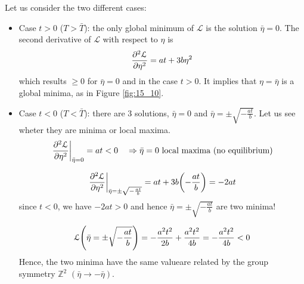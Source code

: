 \documentclass[../main/main.tex]{subfiles}
\begin{document}
Let us consider the two different cases:
\begin{itemize}
\item Case \( t>0 \) (\( T> \bar{T}  \)):  the only global minimum of \( \mathcal{L} \) is the solution \( \bar{\eta }=0  \). The second derivative of \( \mathcal{L} \) with respect to \( \eta  \) is
\begin{equation*}
  \pdv[2]{\mathcal{L}}{\eta } = a t + 3 b \eta ^2
\end{equation*}
which results \( \ge 0 \) for \( \bar{\eta } = 0  \) and in the case \( t>0 \). It implies that \( \eta = \bar{\eta }  \) is a global minima, as in Figure \ref{fig:15_10}.



\item Case \( t<0 \) (\( T< \bar{T}  \)): there are 3 solutions, \( \bar{\eta } = 0  \) and \( \bar{\eta } = \pm \sqrt{- \frac{at}{b}}   \).
Let us see wheter they are minima or local maxima.
\begin{equation*}
  \eval{\pdv[2]{\mathcal{L}}{\eta } }_{\bar{\eta } =0 } = a t < 0 \quad \Rightarrow \bar{\eta } = 0 \text{ local maxima (no equilibrium)}
\end{equation*}

\begin{equation*}
  \eval{\pdv[2]{\mathcal{L}}{\eta } }_{\bar{\eta } = \pm \sqrt{- \frac{at}{b}}  } = a t + 3 b \qty(- \frac{at}{b}) = -2at
\end{equation*}
since \( t<0 \), we have \( -2at >0 \) and hence \( \bar{\eta } = \pm \sqrt{- \frac{at}{b}}   \) are two minima!


\begin{equation*}
  \mathcal{L} \qty(\bar{\eta }  = \pm \sqrt{- \frac{at}{b}} ) = - \frac{a^2 t^2}{2b} + \frac{a^2 t^2}{4b} = - \frac{a^2 t^2}{4b} < 0
\end{equation*}
Hence, the two minima have the same valueare related by the group symmetry \( \mathbb{Z}^2 \)  \( (\bar{\eta } \rightarrow - \bar{\eta }  ) \).
\end{itemize}
\end{document}
